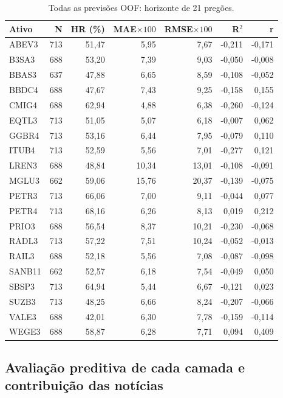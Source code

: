 \begin{table}[H]\centering
\caption{Todas as previsões OOF: horizonte de 21 pregões.}
{\footnotesize\begin{tabular}{lrrrrrr}\hline
Ativo & N & HR (\%) & MAE$\times100$ & RMSE$\times100$ & R$^2$ & r\\ \hline
ABEV3 & 713 & 51,47 & 5,95 & 7,67 & -0,211 & -0,171\\
B3SA3 & 688 & 53,20 & 7,39 & 9,03 & -0,050 & -0,008\\
BBAS3 & 637 & 47,88 & 6,65 & 8,59 & -0,108 & -0,052\\
BBDC4 & 688 & 47,67 & 7,43 & 9,25 & -0,158 & 0,155\\
CMIG4 & 688 & 62,94 & 4,88 & 6,38 & -0,260 & -0,124\\
EQTL3 & 713 & 51,05 & 5,07 & 6,18 & -0,007 & 0,062\\
GGBR4 & 713 & 53,16 & 6,44 & 7,95 & -0,079 & 0,110\\
ITUB4 & 713 & 52,59 & 5,56 & 7,01 & -0,277 & 0,121\\
LREN3 & 688 & 48,84 & 10,34 & 13,01 & -0,108 & -0,091\\
MGLU3 & 662 & 59,06 & 15,76 & 20,37 & -0,139 & -0,075\\
PETR3 & 713 & 66,06 & 7,00 & 9,11 & -0,044 & 0,077\\
PETR4 & 713 & 68,16 & 6,26 & 8,13 & 0,019 & 0,212\\
PRIO3 & 688 & 56,54 & 8,37 & 10,21 & -0,230 & -0,068\\
RADL3 & 713 & 57,22 & 7,51 & 10,24 & -0,052 & -0,013\\
RAIL3 & 688 & 52,18 & 5,56 & 7,08 & -0,087 & -0,098\\
SANB11 & 662 & 52,57 & 6,18 & 7,54 & -0,049 & 0,050\\
SBSP3 & 713 & 64,94 & 5,44 & 6,67 & -0,121 & 0,023\\
SUZB3 & 713 & 48,25 & 6,66 & 8,24 & -0,207 & -0,066\\
VALE3 & 688 & 42,01 & 6,30 & 7,78 & -0,159 & -0,114\\
WEGE3 & 688 & 58,87 & 6,28 & 7,71 & 0,094 & 0,409\\
\hline\end{tabular}}\par{}\end{table}

\subsection{Avaliação preditiva de cada camada e contribuição das notícias}

